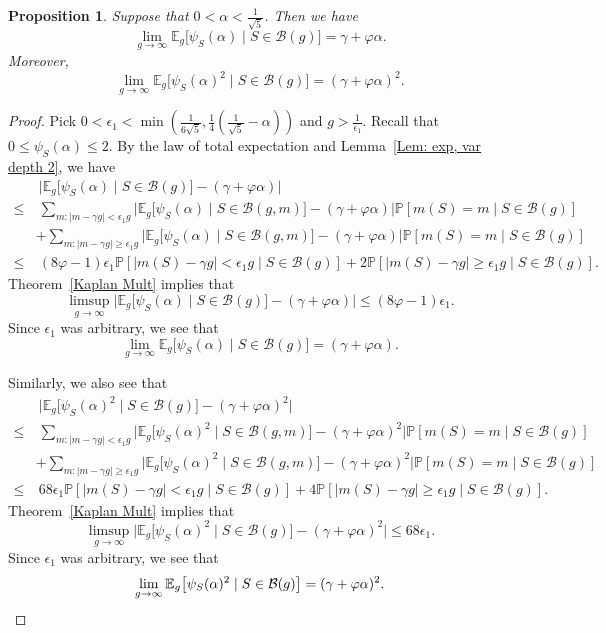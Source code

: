 \documentclass[12pt]{amsart}
\def\E{{\mathbb E}}
\renewcommand{\phi}{\varphi}
\renewcommand{\P}{\mathbb{P}}
\newtheorem{proposition}[theorem]{Proposition}
\begin{document}
\begin{proposition}\label{Prop: small alpha depth 2}
Suppose that $0<\alpha<\frac{1}{\sqrt{5}}$.
Then we have
\[\lim_{g\to\infty} \E_g \big[\psi_S(\alpha)\mid S\in\mathcal B(g)\big] = \gamma+\phi\alpha. \]
Moreover,
\[
\lim_{g\to\infty} \E_g \big[\psi_S(\alpha)^2\mid S\in\mathcal B(g)\big] = (\gamma+\phi\alpha)^2. 
\]
\end{proposition}
\begin{proof}
Pick $0<\epsilon_1 < \min\left(\frac{1}{6\sqrt{5}}, \frac{1}{4} (\frac{1}{\sqrt{5}}-\alpha ) \right)$ and $g>\frac{1}{\epsilon_1}$. Recall that $0\leq \psi_S(\alpha)\leq 2$.
By the law of total expectation and Lemma~\ref{Lem: exp, var depth 2}, we have
\begin{align*}
& \ \Big|\E_g \big[\psi_S(\alpha)\mid S\in\mathcal B(g)\big] -(\gamma+\phi\alpha) \Big|\\
\leq &\ \sum_{m: |m-\gamma g|<\epsilon_1 g} \Big|\E_g \big[\psi_S(\alpha)\mid S\in\mathcal B(g,m)\big] -(\gamma+\phi\alpha) \Big| \P[m(S)=m\mid S\in\mathcal B(g)]\\
& +\sum_{m: |m-\gamma g|\ge \epsilon_1 g} \Big|\E_g \big[\psi_S(\alpha)\mid S\in\mathcal B(g,m)\big] -(\gamma+\phi\alpha) \Big| \P[m(S)=m\mid S\in\mathcal B(g)]\\
\leq &\  (8\phi-1)\epsilon_1 \P[|m(S)-\gamma g|<\epsilon_1 g\mid S\in\mathcal B(g)]
+ 2 \P[|m(S)-\gamma g| \ge \epsilon_1 g\mid S\in\mathcal B(g)].
\end{align*}
Theorem~\ref{Kaplan Mult} implies that
\[
\limsup_{g\to\infty} \Big|\E_g \big[\psi_S(\alpha)\mid S\in\mathcal B(g)\big] -(\gamma+\phi\alpha) \Big| \leq (8\phi-1)\epsilon_1.
\]
Since $\epsilon_1$ was arbitrary, we see that
\[
\lim_{g\to\infty} \E_g \big[\psi_S(\alpha)\mid S\in\mathcal B(g)\big] =(\gamma+\phi\alpha).
\]

Similarly, we also see that
\begin{align*}
& \ \Big|\E_g \big[\psi_S(\alpha)^2\mid S\in\mathcal B(g)\big] -(\gamma+\phi\alpha)^2 \Big|\\
\leq &\ \sum_{m: |m-\gamma g|<\epsilon_1 g} \Big|\E_g \big[\psi_S(\alpha)^2\mid S\in\mathcal B(g,m)\big] -(\gamma+\phi\alpha)^2 \Big| \P[m(S)=m\mid S\in\mathcal B(g)]\\
& +\sum_{m: |m-\gamma g| \ge \epsilon_1 g} \Big|\E_g \big[\psi_S(\alpha)^2\mid S\in\mathcal B(g,m)\big] -(\gamma+\phi\alpha)^2 \Big| \P[m(S)=m\mid S\in\mathcal B(g)]\\
\leq &\ 68\epsilon_1 \P[|m(S)-\gamma g|<\epsilon_1 g\mid S\in\mathcal B(g)]
+ 4 \P[|m(S)-\gamma g|\ge \epsilon_1 g\mid S\in\mathcal B(g)].
\end{align*}
Theorem~\ref{Kaplan Mult} implies that
\[
\limsup_{g\to\infty} \Big|\E_g \big[\psi_S(\alpha)^2\mid S\in\mathcal B(g)\big] -(\gamma+\phi\alpha)^2 \Big| \leq 68\epsilon_1.
\]
Since $\epsilon_1$ was arbitrary, we see that
\[
\lim_{g\to\infty} \E_g \big[\psi_S(\alpha)^2\mid S\in\mathcal B(g)\big] =(\gamma+\phi\alpha)^2.\qedhere
\]
\end{proof}
\end{document}
